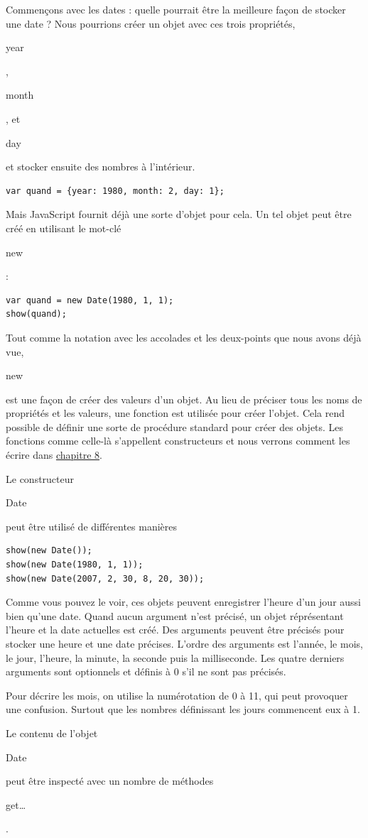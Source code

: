 \documentclass{FramateX}
\renewcommand{\texttt}[1]{\begin{sffamily}{#1}\end{sffamily}}
\begin{document}
Commençons avec les dates : quelle pourrait être la meilleure façon de
stocker une date ? Nous pourrions créer un objet avec ces trois
propriétés, \texttt{year}, \texttt{month}, et \texttt{day} et stocker
ensuite des nombres à l'intérieur.

\begin{lstlisting}
var quand = {year: 1980, month: 2, day: 1};
\end{lstlisting}
Mais JavaScript fournit déjà une sorte d'objet pour cela. Un tel objet
peut être créé en utilisant le mot-clé \texttt{new}:

\begin{lstlisting}
var quand = new Date(1980, 1, 1);
show(quand);
\end{lstlisting}
Tout comme la notation avec les accolades et les deux-points que nous
avons déjà vue, \texttt{new} est une façon de créer des valeurs d'un
objet. Au lieu de préciser tous les noms de propriétés et les valeurs,
une fonction est utilisée pour créer l'objet. Cela rend possible de
définir une sorte de procédure standard pour créer des objets. Les
fonctions comme celle-là s'appellent constructeurs et nous verrons
comment les écrire dans \href{chapter8.html}{chapitre 8}.

Le constructeur \texttt{Date} peut être utilisé de différentes manières

\begin{lstlisting}
show(new Date());
show(new Date(1980, 1, 1));
show(new Date(2007, 2, 30, 8, 20, 30));
\end{lstlisting}
Comme vous pouvez le voir, ces objets peuvent enregistrer l'heure d'un
jour aussi bien qu'une date. Quand aucun argument n'est précisé, un
objet réprésentant l'heure et la date actuelles est créé. Des arguments
peuvent être précisés pour stocker une heure et une date précises.
L'ordre des arguments est l'année, le mois, le jour, l'heure, la minute,
la seconde puis la milliseconde. Les quatre derniers arguments sont
optionnels et définis à 0 s'il ne sont pas précisés.

Pour décrire les mois, on utilise la numérotation de 0 à 11, qui peut
provoquer une confusion. Surtout que les nombres définissant les jours
commencent eux à 1.

\begin{center}\end{center}

Le contenu de l'objet \texttt{Date} peut être inspecté avec un nombre de
méthodes \texttt{get\ldots{}}.
\end{document}
